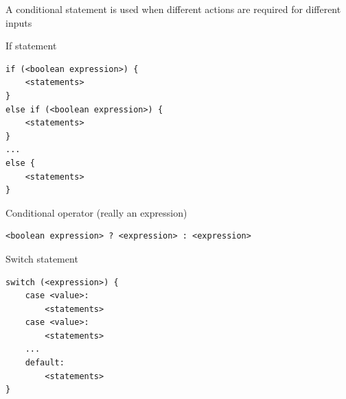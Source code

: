 \documentclass[8pt,a4paper,compress]{beamer}
\begin{document}
\begin{frame}[fragile]
\pause

A conditional statement is used when different actions are required for different inputs

\pause\bigskip

If statement

\smallskip

\begin{lstlisting}[language={},style=focusin]
if (<boolean expression>) {
    <statements>
}
else if (<boolean expression>) {
    <statements>
}
...
else {
    <statements>
}
\end{lstlisting}

\pause\bigskip

Conditional operator (really an expression)

\smallskip

\begin{lstlisting}[language={},style=focusin]
<boolean expression> ? <expression> : <expression>
\end{lstlisting}

\pause\bigskip

Switch statement

\smallskip

\begin{lstlisting}[language={},style=focusin]
switch (<expression>) {
    case <value>:
        <statements>
    case <value>:
        <statements>
    ...
    default:
        <statements>
}
\end{lstlisting}
\end{frame}
\end{document}
